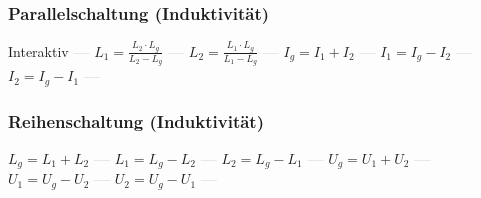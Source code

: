 \subsubsection{Parallelschaltung (Induktivität)} 
\begin{minipage}{0.45\textwidth} 
\end{minipage} 
\begin{minipage}{0.45\textwidth} 
 
\end{minipage} 
Interaktiv \textcolor{lightgray}{\textbf{---}} 
$ L_{1}  = \frac{L_{2} \cdot L_{g} }{L_{2} -L_{g} } $ \textcolor{lightgray}{\textbf{---}} 
$ L_{2}  = \frac{L_{1} \cdot L_{g} }{L_{1} -L_{g} } $ \textcolor{lightgray}{\textbf{---}} 
$ I_{g}  = I_{1}  + I_{2} $ \textcolor{lightgray}{\textbf{---}} 
$ I_{1}  = I_{g}  - I_{2} $ \textcolor{lightgray}{\textbf{---}} 
$ I_{2}  = I_{g}  - I_{1} $ \textcolor{lightgray}{\textbf{---}} 

\subsubsection{Reihenschaltung (Induktivität)} 
\begin{minipage}{0.45\textwidth} 
\end{minipage} 
\begin{minipage}{0.45\textwidth} 
 
\end{minipage} 
$ L_{g}  = L_{1}  + L_{2} $ \textcolor{lightgray}{\textbf{---}} 
$ L_{1}  = L_{g}  - L_{2} $ \textcolor{lightgray}{\textbf{---}} 
$ L_{2}  = L_{g}  - L_{1} $ \textcolor{lightgray}{\textbf{---}} 
$ U_{g}  = U_{1}  + U_{2} $ \textcolor{lightgray}{\textbf{---}} 
$ U_{1}  = U_{g}  - U_{2} $ \textcolor{lightgray}{\textbf{---}} 
$ U_{2}  = U_{g}  - U_{1} $ \textcolor{lightgray}{\textbf{---}} 

